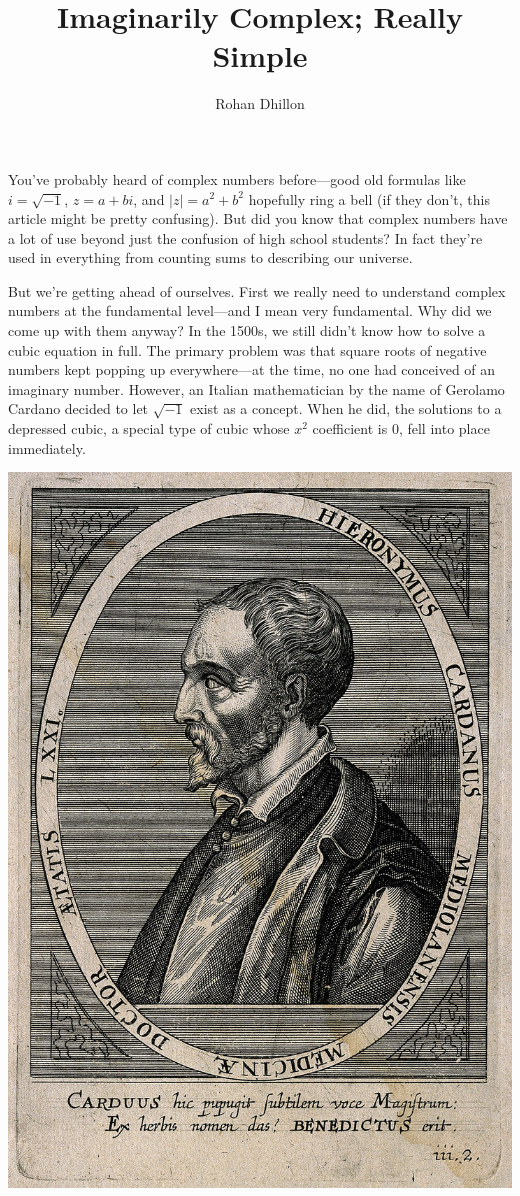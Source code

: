 \documentclass{article}
\title{Imaginarily Complex; Really Simple}
\author{Rohan Dhillon}
\begin{document}
\maketitle
You’ve probably heard of complex numbers before—good old formulas like $i=\sqrt{-1}$, $z=a+bi$, and $|z|=a^2+b^2$ hopefully ring a bell (if they don’t, this article might be pretty confusing). But did you know that complex numbers have a lot of use beyond just the confusion of high school students? In fact they’re used in everything from counting sums to describing our universe. 

But we’re getting ahead of ourselves. First we really need to understand complex numbers at the fundamental level—and I mean very fundamental. Why did we come up with them anyway? In the 1500s, we still didn’t know how to solve a cubic equation in full. The primary problem was that square roots of negative numbers kept popping up everywhere—at the time, no one had conceived of an imaginary number. However, an Italian mathematician by the name of Gerolamo Cardano decided to let $\sqrt{-1}$ exist as a concept. When he did, the solutions to a depressed cubic, a special type of cubic whose $x^2$ coefficient is $0$, fell into place immediately. 
\begin{center}
    \includegraphics[scale=0.1]{images/gerolamo.jpg}
\end{center}
\end{document}
